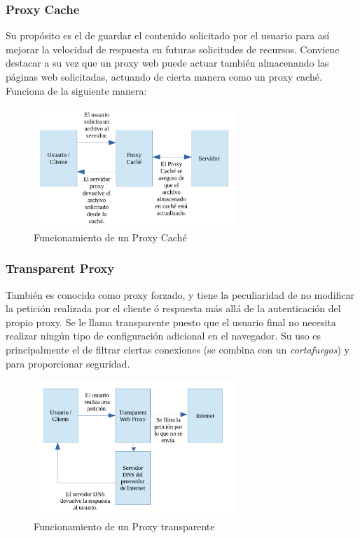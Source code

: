 \subsubsection{Proxy Cache}

Su propósito es el de guardar el contenido solicitado por el usuario para así mejorar la velocidad de respuesta en futuras solicitudes de recursos. 
Conviene destacar a su vez que un proxy web puede actuar también almacenando las páginas web solicitadas, actuando de cierta manera como un proxy caché. Funciona de la siguiente manera:

\begin{figure}[h]
	\centerline{
		\mbox{\includegraphics[width=3.00in]{images/proxy_cache.png}}
	}
	\caption{Funcionamiento de un Proxy Caché}
	\label{fig:proxy_cache}
\end{figure}

\subsubsection{Transparent Proxy}

También es conocido como proxy forzado, y tiene la peculiaridad de no modificar la petición realizada por el cliente ó respuesta más allá de la autenticación del propio proxy.
Se le llama transparente puesto que el usuario final no necesita realizar ningún tipo de configuración adicional en el navegador.
Su uso es principalmente el de filtrar ciertas conexiones (se combina con un \textit{cortafuegos}) y para proporcionar seguridad.

\begin{figure}[h]
	\centerline{
		\mbox{\includegraphics[width=3.00in]{images/proxy_transparent.png}}
	}
	\caption{Funcionamiento de un Proxy transparente~\cite{article:proxy_trans}}
	\label{fig:trans_proxy}
\end{figure}


